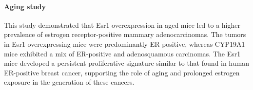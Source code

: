 \paragraph{Aging study}
This study demonstrated that Esr1 overexpression in aged mice led to a higher
prevalence of estrogen receptor-positive mammary adenocarcinomas.
The tumors in Esr1-overexpressing mice were predominantly ER-positive, whereas
CYP19A1 mice exhibited a mix of ER-positive and adenosquamous carcinomas.
The Esr1 mice developed a persistent proliferative signature similar to that
found in human ER-positive breast cancer, supporting the role of aging and
prolonged estrogen exposure in the generation of these
cancers\supercite{furth_overexpression_2023}.

